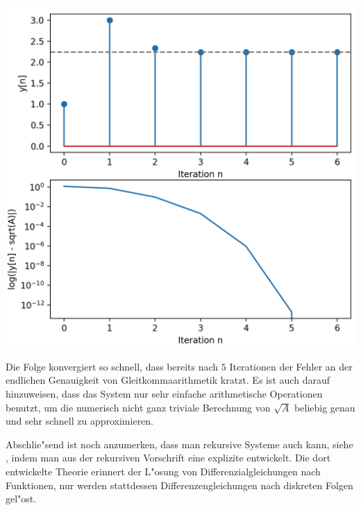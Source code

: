 \begin{listing}
    \noindent
    \begin{minipage}{0.49\textwidth}
        \strut\vspace*{-\baselineskip}\newline
        \inputminted[firstline=5,lastline=15]{python3}{code/square_root.py}
    \end{minipage}%
    \begin{minipage}{0.49\textwidth}
        \strut\vspace*{-\baselineskip}\newline
        \includegraphics[width=\textwidth]{code/square_root.png}
    \end{minipage}
    \label{py:square_root}
\end{listing}
%
%
Die Folge konvergiert so schnell, dass bereits nach $5$ Iterationen der Fehler an der endlichen Genauigkeit von Gleitkommaarithmetik kratzt.
Es ist auch darauf hinzuweisen, dass das System nur sehr einfache arithmetische Operationen benutzt, um die numerisch nicht ganz triviale Berechnung von $\sqrt{A}$ beliebig genau und sehr schnell zu approximieren.

Abschlie"send ist noch anzumerken, dass man rekursive Systeme auch  kann, siehe \cite[Kap.~2.4.3]{proakis2013}, indem man aus der rekursiven Vorschrift eine explizite entwickelt. 
Die dort entwickelte Theorie erinnert der L"osung von Differenzialgleichungen nach Funktionen, nur werden stattdessen Differenzengleichungen nach diskreten Folgen gel"ost.
%
%
